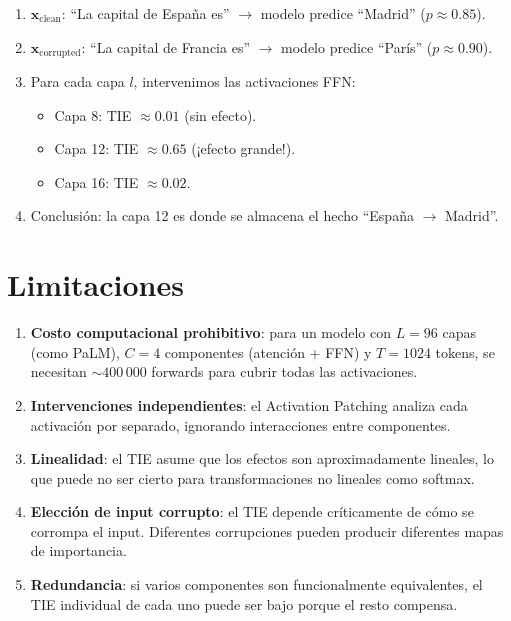 \documentclass[11pt,a4paper]{report}
\theoremstyle{definition}
\begin{document}
\begin{enumerate}
    \item $\mathbf{x}_{\text{clean}}$: ``La capital de España es'' $\rightarrow$ modelo predice ``Madrid'' ($p \approx 0.85$).
    \item $\mathbf{x}_{\text{corrupted}}$: ``La capital de Francia es'' $\rightarrow$ modelo predice ``París'' ($p \approx 0.90$).
    \item Para cada capa $l$, intervenimos las activaciones FFN:
    \begin{itemize}
        \item Capa 8: TIE $\approx 0.01$ (sin efecto).
        \item Capa 12: TIE $\approx 0.65$ (¡efecto grande!).
        \item Capa 16: TIE $\approx 0.02$.
    \end{itemize}
    \item Conclusión: la capa 12 es donde se almacena el hecho ``España $\to$ Madrid''.
\end{enumerate}

\section{Limitaciones}

\begin{enumerate}
    \item \textbf{Costo computacional prohibitivo}: para un modelo con $L=96$ capas (como PaLM), $C=4$ componentes (atención + FFN) y $T=1024$ tokens, se necesitan $\sim 400\,000$ forwards para cubrir todas las activaciones.
    \item \textbf{Intervenciones independientes}: el Activation Patching analiza cada activación por separado, ignorando interacciones entre componentes.
    \item \textbf{Linealidad}: el TIE asume que los efectos son aproximadamente lineales, lo que puede no ser cierto para transformaciones no lineales como softmax.
    \item \textbf{Elección de input corrupto}: el TIE depende críticamente de cómo se corrompa el input. Diferentes corrupciones pueden producir diferentes mapas de importancia.
    \item \textbf{Redundancia}: si varios componentes son funcionalmente equivalentes, el TIE individual de cada uno puede ser bajo porque el resto compensa.
\end{enumerate}

\newpage
\end{document}
